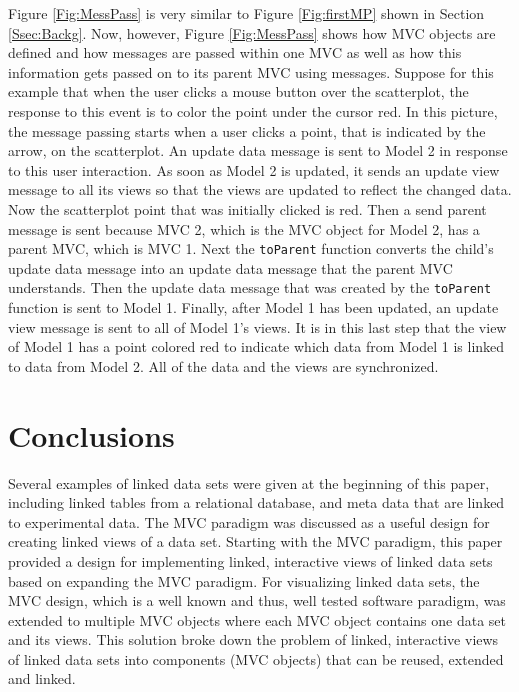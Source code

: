 \documentclass{article}[11pt]
\newcommand{\Rfunction}[1]{{\texttt{#1}}}
\begin{document}
Figure \ref{Fig:MessPass} is very similar to Figure \ref{Fig:firstMP} shown in
Section \ref{Ssec:Backg}.  Now, however, Figure \ref{Fig:MessPass} shows how
MVC objects are defined and how messages are passed within one MVC as well
as how this information gets passed on to its parent MVC using messages.
Suppose for this example that when the user clicks a mouse button over the
scatterplot, the response to this event is to color the point under the cursor
red.  In this picture, the message passing starts when a user clicks a point,
that is indicated by the arrow, on the scatterplot.  An update data message is
sent to Model 2 in response to this user interaction.  As soon as Model 2 is
updated, it sends an update view message to all its views so that the views
are updated to reflect the changed data.  Now the scatterplot point that was
initially clicked is red.  Then a send parent message is sent because MVC
2, which is the MVC object for Model 2, has a parent MVC, which is MVC 1.  Next
the \Rfunction{toParent} function converts the child's update data message
into an update data message that the parent MVC understands.  Then the
update data message that was created by the \Rfunction{toParent} function is
sent to Model 1.  Finally, after Model 1 has been updated, an update view
message is sent to all of Model 1's views.  It is in this last step that the
view of Model 1 has a point colored red to indicate which data from Model 1 is
linked to data from Model 2.  All of the data and the views are
synchronized. 

\section{Conclusions}\label{Sec:Conc}

Several examples of linked data sets were given at the beginning of this
paper, including linked tables from a relational database, and meta data that
are linked to experimental data.  The MVC paradigm was
discussed as a useful design for creating linked views of a data set.
Starting with the MVC paradigm, this paper provided a design for implementing
linked, interactive views of linked data sets based on expanding the MVC
paradigm.  For visualizing linked data sets, the MVC design, which is a well
known and thus, well tested software paradigm, was extended to multiple MVC
objects where each MVC object contains one data set and its views.  This
solution broke down the problem of linked, interactive views of linked data
sets into components (MVC objects) that can be reused, extended and linked.
\end{document}

